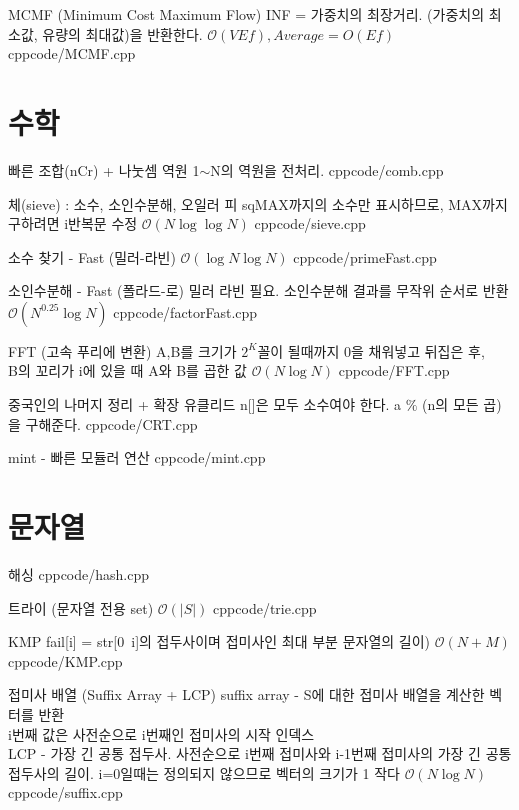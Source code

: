 \documentclass[landscape, 10pt, a4paper, oneside, twocolumn]{extarticle}
\begin{document}
\Algorithm
{MCMF (Minimum Cost Maximum Flow)}
{INF = 가중치의 최장거리. (가중치의 최소값, 유량의 최대값)을 반환한다.}
{$\mathcal{O}(VEf),{}Average = {O}(Ef)$}
{cpp}{code/MCMF.cpp}





\section{수학}

\Algorithm
{빠른 조합(nCr) + 나눗셈 역원}
{1$\sim$N의 역원을 전처리.
}
{}
{cpp}{code/comb.cpp}

\Algorithm
{체(sieve) : 소수, 소인수분해, 오일러 피}
{sqMAX까지의 소수만 표시하므로, MAX까지 구하려면 i반복문 수정
}
{$\mathcal{O}(N\log\log{N})$}
{cpp}{code/sieve.cpp}

\Algorithm
{소수 찾기 - Fast (밀러-라빈)}
{}
{$\mathcal{O}(\log{N}\log{N})$}
{cpp}{code/primeFast.cpp}

\Algorithm
{소인수분해 - Fast (폴라드-로)}
{밀러 라빈 필요. 소인수분해 결과를 무작위 순서로 반환}
{$\mathcal{O}(N^{0.25}\log{N})$}
{cpp}{code/factorFast.cpp}

\Algorithm
{FFT (고속 푸리에 변환)}
{A,B를 크기가 $2^K$꼴이 될때까지 0을 채워넣고 뒤집은 후, \\B의 꼬리가 i에 있을 때 A와 B를 곱한 값}
{$\mathcal{O}(N\log{N})$}
{cpp}{code/FFT.cpp}

\Algorithm
{중국인의 나머지 정리 + 확장 유클리드}
{n[]은 모두 소수여야 한다. a $\%$ (n의 모든 곱)을 구해준다.}
{}
{cpp}{code/CRT.cpp}

\Algorithm
{mint - 빠른 모듈러 연산}
{}
{}
{cpp}{code/mint.cpp}


\section{문자열}

\Algorithm
{해싱}
{}
{}
{cpp}{code/hash.cpp}

\Algorithm
{트라이 (문자열 전용 set)}
{}
{$\mathcal{O}(|S|)$}
{cpp}{code/trie.cpp}

\Algorithm
{KMP}
{fail[i] = str[0~i]의 접두사이며 접미사인 최대 부분 문자열의 길이)}
{$\mathcal{O}(N+M)$}
{cpp}{code/KMP.cpp}


\Algorithm
{접미사 배열 (Suffix Array + LCP)}
{suffix array - S에 대한 접미사 배열을 계산한 벡터를 반환\\
i번째 값은 사전순으로 i번째인 접미사의 시작 인덱스\\
LCP - 가장 긴 공통 접두사. 사전순으로 i번째 접미사와 i-1번째 접미사의 가장 긴 공통 접두사의 길이. i=0일때는 정의되지 않으므로 벡터의 크기가 1 작다}
{$\mathcal{O}(N\log{N})$}
{cpp}{code/suffix.cpp}
\end{document}
